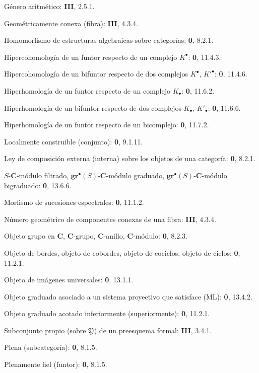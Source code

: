 \begin{flushleft}
Género aritmético: \textbf{III}, 2.5.1.

Geométricamente conexa (fibra): \textbf{III}, 4.3.4.

Homomorfismo de estructuras algebraicas sobre categorías: \textbf 0, 8.2.1.

Hipercohomología de un funtor respecto de un complejo $K^\bullet$:
\textbf 0, 11.4.3.

Hipercohomología de un bifuntor respecto de dos complejos
$K^\bullet$, $K'^{\bullet}$: \textbf 0, 11.4.6.

Hiperhomología de un funtor respecto de un complejo $K_\bullet$:
\textbf 0, 11.6.2.

Hiperhomología de un bifuntor respecto de dos complejos $K_\bullet$,
$K'_\bullet$: \textbf 0, 11.6.6.

Hiperhomología de un funtor respecto de un bicomplejo: \textbf 0, 11.7.2.

Localmente construible (conjunto): \textbf 0, 9.1.11.

Ley de composición externa (interna) sobre los objetos de una categoría: \textbf 0, 8.2.1.


$S$-$\boldsymbol{C}$-módulo filtrado, $\mathbf{gr}^\bullet(S)$-$\boldsymbol{C}$-módulo graduado,
$\mathbf{gr}^\bullet(S)$-$\boldsymbol{C}$-módulo bigraduado: \textbf 0, 13.6.6.

Morfismo de sucesiones espectrales: \textbf 0, 11.1.2.

Número geométrico de componentes conexas de una fibra: \textbf{III}, 4.3.4.

Objeto grupo en $\boldsymbol{C}$, $\boldsymbol{C}$-grupo, $\boldsymbol{C}$-anillo, $\boldsymbol{C}$-módulo: \textbf 0, 8.2.3.

Objeto de bordes, objeto de cobordes, objeto de cociclos, objeto de
ciclos: \textbf 0, 11.2.1.

Objeto de imágenes universales: \textbf 0, 13.1.1.

Objeto graduado asociado a un sistema proyectivo que satisface (ML): \textbf 0, 13.4.2.

Objeto graduado acotado inferiormente (superiormente): \textbf 0, 11.2.1.

Subconjunto propio (sobre $\mathfrak Y$) de un preesquema formal: \textbf{III}, 3.4.1.

Plena (subcategoría): \textbf 0, 8.1.5.

Plenamente fiel (funtor): \textbf 0, 8.1.5.


\end{flushleft}
